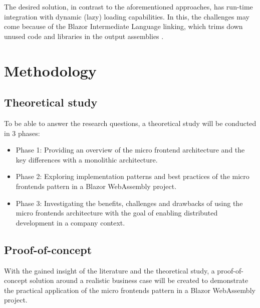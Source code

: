 The desired solution, in contrast to the aforementioned approaches, has run-time
integration with dynamic (lazy) loading capabilities. In this, the challenges
may come because of the Blazor Intermediate Language linking, which trims down
unused code and libraries in the output assemblies \autocite{Latham_2020}. 


\section{Methodology}
\label{sec:methodology}


\subsection{Theoretical study}
To be able to answer the research questions, a theoretical study will be
conducted in 3 phases:
\begin{itemize}
    \item Phase 1: Providing an overview of the micro frontend architecture and
    the key differences with a monolithic architecture.
    \item Phase 2: Exploring implementation patterns and best practices of the
    micro frontends pattern in a Blazor WebAssembly project.
    \item Phase 3: Investigating the benefits, challenges and drawbacks of using
    the micro frontends architecture with the goal of enabling distributed
    development in a company context.
\end{itemize}

\subsection{Proof-of-concept}
With the gained insight of the literature and the theoretical study, a
proof-of-concept solution around a realistic business case will be created to
demonstrate the practical application of the micro frontends pattern in a Blazor
WebAssembly project.

